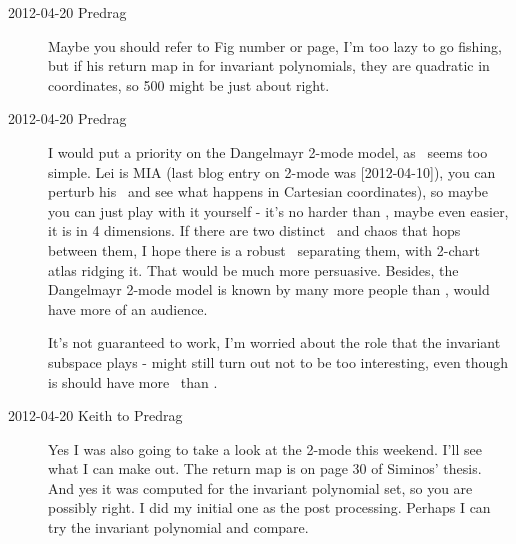 \begin{description}
\item[2012-04-20 Predrag] Maybe you should refer to Fig number or page,
I'm too lazy to go fishing, but if his return map in for invariant
polynomials, they are quadratic in coordinates, so 500 might be just
about right.

\item[2012-04-20 Predrag] I would put a priority on the Dangelmayr 2-mode
model, as \cLe\ seems too simple. Lei is MIA (last blog entry on 2-mode
was [2012-04-10]), you can perturb his \reqva\ and see what happens in
Cartesian coordinates), so maybe you can just play with it yourself -
it's no harder than \cLe, maybe even easier, it is in 4 dimensions. If
there are two distinct \reqva\ and chaos that hops between them, I hope
there is a robust \chartBord\ separating them, with 2-chart atlas ridging
it. That would be much more persuasive. Besides, the Dangelmayr 2-mode
model is known by many more people than \cLe, would have more of an
audience.

It's not guaranteed to work, I'm worried about the role that the
invariant subspace plays - might still turn out not to be too
interesting, even though is should have more \reqva\ than \cLe.

\item[2012-04-20 Keith to Predrag]  Yes I was also going to take a look at the 2-mode this weekend.  I'll see what I can make out. The return map is on page 30 of Siminos' thesis.  And yes it was computed for the invariant polynomial set, so you are possibly right.  I did my initial one as the post processing.  Perhaps I can try the invariant polynomial and compare.


\end{description}
